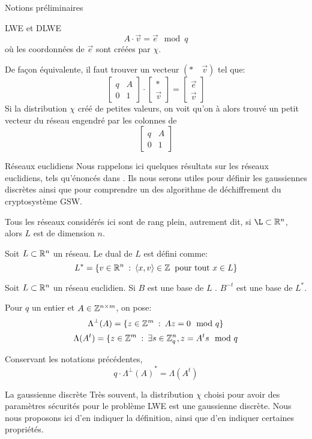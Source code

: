 \begin{section}{Notions préliminaires}
\begin{subsection}{LWE et DLWE}
	\[ A\cdot \vec{v} = \vec{e} \mod q \]
	où les coordonnées de $\vec{e}$ sont créées par $\chi$.

	De façon équivalente, il faut trouver un vecteur $(*\quad\vec{v})$ tel
	que:
	\[ \begin{bmatrix}q & A \\ 0 &1 \end{bmatrix}\cdot
	   \begin{bmatrix}* \\ \vec{v} \end{bmatrix} =
	   \begin{bmatrix} \vec{e} \\ \vec{v} \end{bmatrix} \]
	Si la distribution $\chi$ créé de petites valeurs, on voit qu'on à
	alors trouvé un \og petit \fg vecteur du réseau engendré par les colonnes de 
	\[ \begin{bmatrix}q & A \\ 0 &1 \end{bmatrix} \]
	\end{subsection}

	\begin{subsection}{Réseaux euclidiens}
	Nous rappelons ici quelques résultats sur les réseaux
	euclidiens, tels qu'énoncés dans \cite{EC:MicPei12}. 
	Ils nous serons utiles pour définir les gaussiennes discrètes ainsi que pour comprendre un des algorithme de 
	déchiffrement du cryptosystème GSW. 

	Tous les réseaux considérés ici sont de rang plein, autrement dit, 
	si $\L \subset \RR^n$, alors $L$ est de dimension $n$.

	\begin{definition}
	Soit $L\subset \mathbb{R}^n$ un réseau. Le dual de $L$ est 
	défini comme:
	\[ L^* = \{ v \in \mathbb{R}^n \::\: \langle x, v \rangle \in \mathbb{Z}
	   \:\text{ pour tout } x\in L\} \]
	\end{definition}
	\begin{prop} 
	Soit $L \subset \mathbb{R}^n$ un réseau euclidien.
	Si $B$ est une base de $L$ .
	$B^{-t}$ est une base de $L^*$.
	\end{prop}

	Pour $q$ un entier et $A \in \mathbb{Z}^{n\times m}$, on pose:
		\[\Lambda^\bot(A) = \{ z \in \mathbb{Z}^m\: :\: A z  = 0 \mod q \}\] 
	\[\Lambda(A^t) = \{ z \in \mathbb{Z}^m\: : \: \exists s\in \mathbb{Z}_q^n, 
	z = A^t s \mod q\]

		\begin{prop} \label{lambda_reseau}
	Conservant les notations précédentes, 
	\[q \cdot {\Lambda^\bot(A)}^* =  \Lambda(A^t)\] 
	\end{prop}
	\end{subsection}
	\begin{subsection}{La gaussienne discrète}
	Très souvent, la distribution $\chi$ choisi pour avoir 
	des paramètres sécurités pour le problème LWE est
	une gaussienne discrète. Nous nous proposons ici 
	d'en indiquer la définition, ainsi que d'en indiquer 
	certaines propriétés.


\end{subsection}
\end{section}

